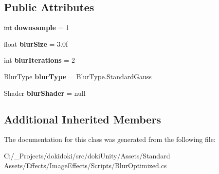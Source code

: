 \subsection*{Public Attributes}
\begin{DoxyCompactItemize}
\item 
int {\bfseries downsample} = 1\hypertarget{class_unity_standard_assets_1_1_image_effects_1_1_blur_optimized_a19e07e0ba50a164698d1b78884dff182}{}\label{class_unity_standard_assets_1_1_image_effects_1_1_blur_optimized_a19e07e0ba50a164698d1b78884dff182}

\item 
float {\bfseries blur\+Size} = 3.\+0f\hypertarget{class_unity_standard_assets_1_1_image_effects_1_1_blur_optimized_a76eb4bf88962770b9791b64df3c60408}{}\label{class_unity_standard_assets_1_1_image_effects_1_1_blur_optimized_a76eb4bf88962770b9791b64df3c60408}

\item 
int {\bfseries blur\+Iterations} = 2\hypertarget{class_unity_standard_assets_1_1_image_effects_1_1_blur_optimized_acc965e0aba51c9917b577449e13eb61f}{}\label{class_unity_standard_assets_1_1_image_effects_1_1_blur_optimized_acc965e0aba51c9917b577449e13eb61f}

\item 
Blur\+Type {\bfseries blur\+Type} = Blur\+Type.\+Standard\+Gauss\hypertarget{class_unity_standard_assets_1_1_image_effects_1_1_blur_optimized_a65821cd7517fbb96a9333b9a14df967d}{}\label{class_unity_standard_assets_1_1_image_effects_1_1_blur_optimized_a65821cd7517fbb96a9333b9a14df967d}

\item 
Shader {\bfseries blur\+Shader} = null\hypertarget{class_unity_standard_assets_1_1_image_effects_1_1_blur_optimized_ae2dcb0d61dd83dfca75a9fa3676d6a3c}{}\label{class_unity_standard_assets_1_1_image_effects_1_1_blur_optimized_ae2dcb0d61dd83dfca75a9fa3676d6a3c}

\end{DoxyCompactItemize}
\subsection*{Additional Inherited Members}


The documentation for this class was generated from the following file\+:\begin{DoxyCompactItemize}
\item 
C\+:/\+\_\+\+Projects/dokidoki/src/doki\+Unity/\+Assets/\+Standard Assets/\+Effects/\+Image\+Effects/\+Scripts/Blur\+Optimized.\+cs\end{DoxyCompactItemize}
